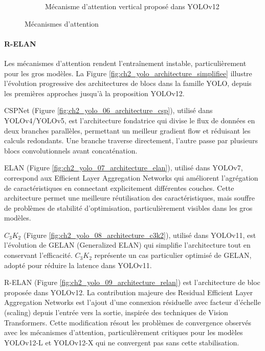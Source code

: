 \begin{figure}[H]
\begin{subfigure}[b]{0.30\textwidth}
        \caption{Mécanisme d'attention vertical proposé dans YOLOv12}
        \label{fig:ch2_yolo_05_attention_area_yolo2}
    \end{subfigure}    
    \caption{Mécanismes d'attention \cite{tian_yolov12_2025}}
    \label{fig:ch2_yolo_mecanismes_attention}
\end{figure}

\paragraph{R-ELAN}
Les mécanismes d'attention rendent l'entraînement instable, particulièrement pour les gros modèles. La Figure \ref{fig:ch2_yolo_architecture_simplifiee} illustre l'évolution progressive des architectures de blocs dans la famille YOLO, depuis les premières approches jusqu'à la proposition YOLOv12.

CSPNet (Figure \ref{fig:ch2_yolo_06_architecture_csp}), utilisé dans YOLOv4/YOLOv5, est l'architecture fondatrice qui divise le flux de données en deux branches parallèles, permettant un meilleur gradient flow et réduisant les calculs redondants. Une branche traverse directement, l'autre passe par plusieurs blocs convolutionnels avant concaténation.

ELAN (Figure \ref{fig:ch2_yolo_07_architecture_elan}), utilisé dans YOLOv7, correspond aux Efficient Layer Aggregation Networks qui améliorent l'agrégation de caractéristiques en connectant explicitement différentes couches. Cette architecture permet une meilleure réutilisation des caractéristiques, mais souffre de problèmes de stabilité d'optimisation, particulièrement visibles dans les gros modèles.

$C_3K_2$ (Figure \ref{fig:ch2_yolo_08_architecture_c3k2}), utilisé dans YOLOv11, est l'évolution de GELAN (Generalized ELAN) qui simplifie l'architecture tout en conservant l'efficacité. $C_3K_2$ représente un cas particulier optimisé de GELAN, adopté pour réduire la latence dans YOLOv11.

R-ELAN (Figure \ref{fig:ch2_yolo_09_architecture_relan}) est l'architecture de bloc proposée dans YOLOv12. La contribution majeure des Residual Efficient Layer Aggregation Networks est l'ajout d'une connexion résiduelle avec facteur d'échelle (scaling) depuis l'entrée vers la sortie, inspirée des techniques de Vision Transformers. Cette modification résout les problèmes de convergence observés avec les mécanismes d'attention, particulièrement critiques pour les modèles YOLOv12-L et YOLOv12-X qui ne convergent pas sans cette stabilisation.


